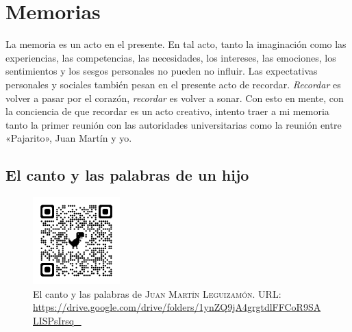 \chapter{Memorias}
\label{cap:memorias}

La memoria es un acto en el presente. En tal acto, tanto la imaginación como las experiencias, las competencias, las necesidades, los intereses, las emociones, los sentimientos y los sesgos personales no pueden no influir. Las expectativas personales y sociales también pesan en el presente acto de recordar. \emph{Recordar} es volver a pasar por el corazón, \emph{recordar} es volver a sonar. Con esto en mente, con la conciencia de que recordar es un acto creativo, intento traer a mi memoria tanto la primer reunión con las autoridades universitarias como la reunión entre «Pajarito», Juan Martín y yo.


\section{El canto y las palabras de un hijo}
\label{sec:palabra-canto}

\begin{figure}[H]
\centering
\includegraphics[width=0.3\textwidth]{img/qrcode-himno-memoria}
\caption[El canto y las palabras de \textsc{Juan Martín Leguizamón}]{El canto y las palabras de \textsc{Juan Martín Leguizamón}. URL: \url{https://drive.google.com/drive/folders/1ynZQ9jA4grgtdlFFCoR9SALISPsIrsq_}}
\label{fig:canto-palabras}
\end{figure}


